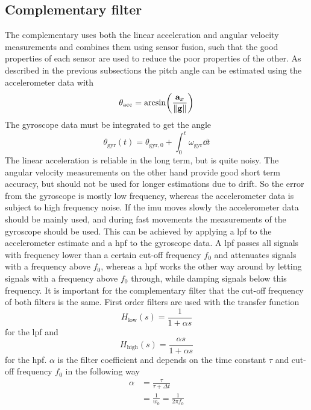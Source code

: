 \subsection{Complementary filter}
The complementary uses both the linear acceleration and angular velocity measurements and combines them using sensor fusion, such that the good properties of each sensor are used to reduce the poor properties of the other.
As described in the previous subsections the pitch angle can be estimated using the accelerometer data with
\begin{equation}
    \theta_\mathrm{acc}  = \arcsin(\frac{\vb{a}_x}{\norm{\vb{g}}})
\end{equation}
The gyroscope data must be integrated to get the angle
\begin{equation}
    \theta_\mathrm{gyr}(t) = \theta_\mathrm{gyr,0} + \int_0^t \omega_\mathrm{gyr}  \dd{t}
\end{equation}
The linear acceleration is reliable in the long term, but is quite noisy.
The angular velocity measurements on the other hand provide good short term accuracy, but should not be used for longer estimations due to drift.
So the error from the gyroscope is mostly low frequency, whereas the accelerometer data is subject to high frequency noise.
If the \gls{imu} moves slowly the accelerometer data should be mainly used, and during fast movements the measurements of the gyroscope should be used.
This can be achieved by applying a \gls{lpf} to the accelerometer estimate and a \gls{hpf} to the gyroscope data.
A \gls{lpf} passes all signals with frequency lower than a certain cut-off frequency $f_0$ and attenuates signals with a frequency above $f_0$, whereas a \gls{hpf} works the other way around by letting signals with a frequency above $f_0$ through, while damping signals below this frequency.
It is important for the complementary filter that the cut-off frequency of both filters is the same.
First order filters are used with the transfer function
\begin{equation}
    H_\mathrm{low} (s) = \frac{1}{1 + \alpha s}
\end{equation}
for the \gls{lpf} and
\begin{equation}
    H_\mathrm{high} (s) = \frac{\alpha s}{1 + \alpha s}
\end{equation}
for the \gls{hpf}.
$\alpha$ is the filter coefficient and depends on the time constant $\tau$ and cut-off frequency $f_0$ in the following way
\begin{align}
    \alpha & = \frac{\tau}{\tau + \Delta t}       \\
           & = \frac{1}{w_0} = \frac{1}{2\pi f_0}
    \label{eq:filter_f0}
\end{align}

